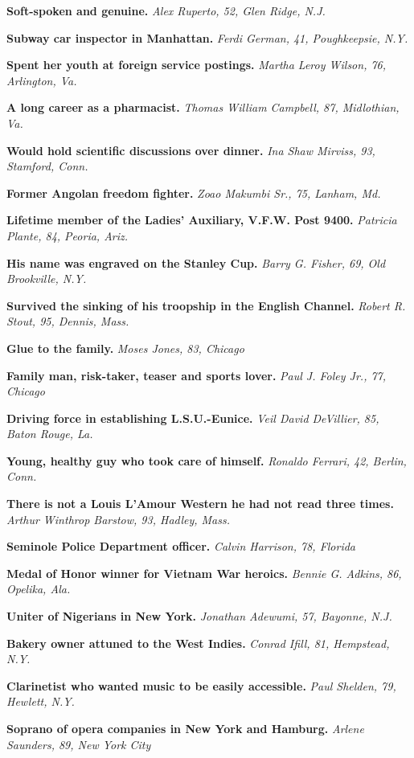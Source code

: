 \textbf{Soft-spoken and genuine.} \emph{Alex Ruperto, 52, Glen Ridge,
N.J.}

\textbf{Subway car inspector in Manhattan.} \emph{Ferdi German, 41,
Poughkeepsie, N.Y.}

\textbf{Spent her youth at foreign service postings.} \emph{Martha Leroy
Wilson, 76, Arlington, Va.}

\textbf{A long career as a pharmacist.} \emph{Thomas William Campbell,
87, Midlothian, Va.}

\textbf{Would hold scientific discussions over dinner.} \emph{Ina Shaw
Mirviss, 93, Stamford, Conn.}

\textbf{Former Angolan freedom fighter.} \emph{Zoao Makumbi Sr., 75,
Lanham, Md.}

\textbf{Lifetime member of the Ladies' Auxiliary, V.F.W. Post 9400.}
\emph{Patricia Plante, 84, Peoria, Ariz.}

\textbf{His name was engraved on the Stanley Cup.} \emph{Barry G.
Fisher, 69, Old Brookville, N.Y.}

\textbf{Survived the sinking of his troopship in the English Channel.}
\emph{Robert R. Stout, 95, Dennis, Mass.}

\textbf{Glue to the family.} \emph{Moses Jones, 83, Chicago}

\textbf{Family man, risk-taker, teaser and sports lover.} \emph{Paul J.
Foley Jr., 77, Chicago}

\textbf{Driving force in establishing L.S.U.-Eunice.} \emph{Veil David
DeVillier, 85, Baton Rouge, La.}

\textbf{Young, healthy guy who took care of himself.} \emph{Ronaldo
Ferrari, 42, Berlin, Conn.}

\textbf{There is not a Louis L'Amour Western he had not read three
times.} \emph{Arthur Winthrop Barstow, 93, Hadley, Mass.}

\textbf{Seminole Police Department officer.} \emph{Calvin Harrison, 78,
Florida}

\textbf{Medal of Honor winner for Vietnam War heroics.} \emph{Bennie G.
Adkins, 86, Opelika, Ala.}

\textbf{Uniter of Nigerians in New York.} \emph{Jonathan Adewumi, 57,
Bayonne, N.J.}

\textbf{Bakery owner attuned to the West Indies.} \emph{Conrad Ifill,
81, Hempstead, N.Y.}

\textbf{Clarinetist who wanted music to be easily accessible.}
\emph{Paul Shelden, 79, Hewlett, N.Y.}

\textbf{Soprano of opera companies in New York and Hamburg.}
\emph{Arlene Saunders, 89, New York City}

